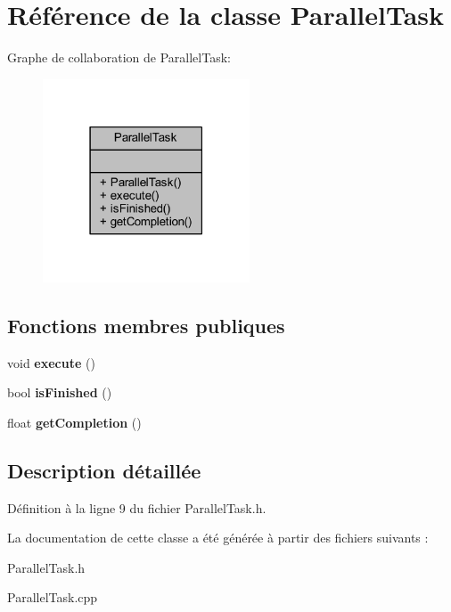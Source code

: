 \hypertarget{class_parallel_task}{}\section{Référence de la classe Parallel\+Task}
\label{class_parallel_task}


Graphe de collaboration de Parallel\+Task\+:\nopagebreak
\begin{figure}[H]
\begin{center}
\leavevmode
\includegraphics[width=174pt]{class_parallel_task__coll__graph}
\end{center}
\end{figure}
\subsection*{Fonctions membres publiques}
\begin{DoxyCompactItemize}
\item 
\hypertarget{class_parallel_task_ad1e7ba9134cc7961ab178a2f47cf54be}{}\label{class_parallel_task_ad1e7ba9134cc7961ab178a2f47cf54be} 
void {\bfseries execute} ()
\item 
\hypertarget{class_parallel_task_a1a67f547aa382fac2087184b2eb19148}{}\label{class_parallel_task_a1a67f547aa382fac2087184b2eb19148} 
bool {\bfseries is\+Finished} ()
\item 
\hypertarget{class_parallel_task_ada45e4db1aa8a89f20ab0b8662c6dabc}{}\label{class_parallel_task_ada45e4db1aa8a89f20ab0b8662c6dabc} 
float {\bfseries get\+Completion} ()
\end{DoxyCompactItemize}


\subsection{Description détaillée}


Définition à la ligne 9 du fichier Parallel\+Task.\+h.



La documentation de cette classe a été générée à partir des fichiers suivants \+:\begin{DoxyCompactItemize}
\item 
Parallel\+Task.\+h\item 
Parallel\+Task.\+cpp\end{DoxyCompactItemize}

